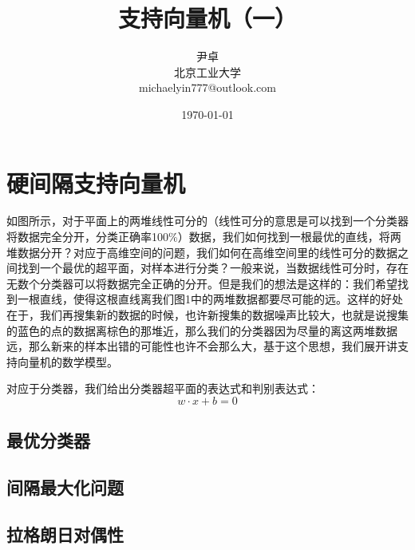\documentclass[UTF8, 12pt]{ctexart}
\begin{document}
\title{\heiti 支持向量机（一）}
\author{\kaishu 尹卓\\北京工业大学\\michaelyin777@outlook.com}
\date{\today}
\maketitle

\tableofcontents
\newpage

\section{硬间隔支持向量机}
如图所示，对于平面上的两堆线性可分的（线性可分的意思是可以找到一个分类器将数据完全分开，分类正确率100\%）数据，我们如何找到一根最优的直线，将两堆数据分开？对应于高维空间的问题，我们如何在高维空间里的线性可分的数据之间找到一个最优的超平面，对样本进行分类？一般来说，当数据线性可分时，存在无数个分类器可以将数据完全正确的分开。但是我们的想法是这样的：我们希望找到一根直线，使得这根直线离我们图1中的两堆数据都要尽可能的远。这样的好处在于，我们再搜集新的数据的时候，也许新搜集的数据噪声比较大，也就是说搜集的蓝色的点的数据离棕色的那堆近，那么我们的分类器因为尽量的离这两堆数据远，那么新来的样本出错的可能性也许不会那么大，基于这个思想，我们展开讲支持向量机的数学模型。

对应于分类器，我们给出分类器超平面的表达式和判别表达式：
\begin{equation}
	w \cdot x + b = 0
\end{equation}

\subsection{最优分类器}
\subsection{间隔最大化问题}
\subsection{拉格朗日对偶性}
\end{document}
